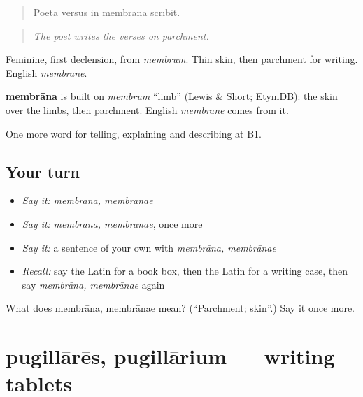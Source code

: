 \begin{quote}
Poēta versūs in membrānā scrībit.
\end{quote}

\begin{quote}
\emph{The poet writes the verses on parchment.}
\end{quote}

Feminine, first declension, from \emph{membrum}. Thin skin, then parchment for writing. English \emph{membrane}.

\begin{cousinweb}
\textbf{membrāna} is built on \emph{membrum} \textquotedblleft{}limb\textquotedblright{} (Lewis \& Short; EtymDB): the skin over the limbs, then parchment. English \emph{membrane} comes from it.
\end{cousinweb}

\begin{grammarlens}[title={What you've built}]
One more word for telling, explaining and describing at B1.
\end{grammarlens}

\subsection*{Your turn}
\begin{itemize}
\raggedright
  \item \emph{Say it:} \emph{membrāna, membrānae}
  \item \emph{Say it:} \emph{membrāna, membrānae}, once more
  \item \emph{Say it:} a sentence of your own with \emph{membrāna, membrānae}
  \item \emph{Recall:} say the Latin for a book box, then the Latin for a writing case, then say \emph{membrāna, membrānae} again
\end{itemize}

\begin{tcolorbox}[breakable,colback=teal!4,colframe=teal!35!black,title={Before you move on}]
What does membrāna, membrānae mean? (\textquotedblleft{}Parchment; skin\textquotedblright{}.) Say it once more.
\end{tcolorbox}
\section[pugillārēs, pugillārium]{pugillārēs, pugillārium — writing tablets}

\label{lesson:LA-C551-pugillares}



